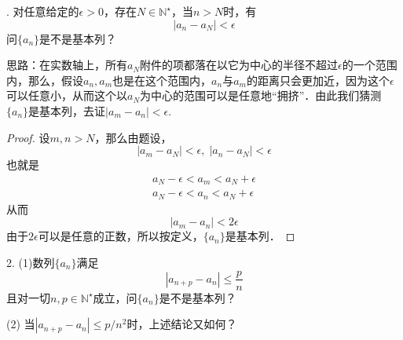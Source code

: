 . 对任意给定的$\epsilon > 0$，存在$N \in \mathbb{N}^\star$，当$n > N$时，有
\begin{equation}
    |a_n - a_N|<\epsilon
\end{equation}
问$\{a_n\}$是不是基本列？

思路：在实数轴上，所有$a_N$附件的项都落在以它为中心的半径不超过$\epsilon$的一个范围内，那么，假设$a_n, a_m$也是在这个范围内，$a_n$与$a_m$的距离只会更加近，因为这个$\epsilon$可以任意小，从而这个以$a_N$为中心的范围可以是任意地``拥挤''．由此我们猜测$\{a_n\}$是基本列，去证$|a_m - a_n|<\epsilon$.

\begin{proof}
设$m, n>N$，那么由题设，
\begin{equation}
    |a_m - a_N|<\epsilon, \; |a_n - a_N| <\epsilon
\end{equation}
也就是
\begin{align}
    a_N - \epsilon < a_m < a_N + \epsilon \\
    a_N - \epsilon < a_n < a_N + \epsilon 
\end{align}
从而
\begin{equation}
    |a_m - a_n| < 2\epsilon
\end{equation}
由于$2\epsilon$可以是任意的正数，所以按定义，$\{a_n\}$是基本列．
\end{proof}

2. (1)数列$\{a_n\}$满足
\begin{equation}
    |a_{n+p}-a_n|\leq\frac{p}{n}
\end{equation}
且对一切$n,p\in\mathbb{N}^\star$成立，问$\{ a_n\}$是不是基本列？

(2) 当$|a_{n+p} - a_n| \leq p/n^2$时，上述结论又如何？

